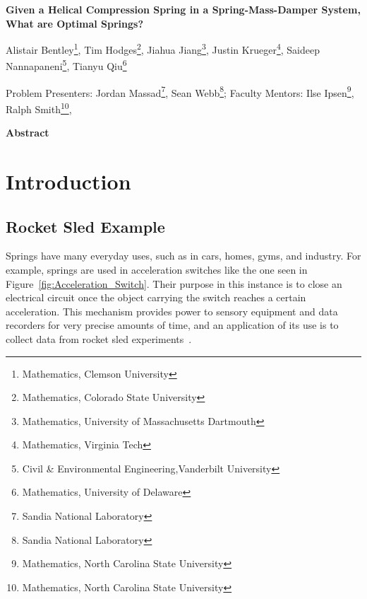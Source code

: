 \documentclass[10pt]{article}
\begin{document}
\centerline{\large \bf Given a Helical Compression Spring in a Spring-Mass-Damper System, What are Optimal Springs?}

\vspace{.1truein}

\def\thefootnote{\arabic{footnote}}
\begin{center}
  
  Alistair Bentley\footnote{Mathematics, Clemson University},
   Tim Hodges\footnote{Mathematics, Colorado State University},
   Jiahua Jiang\footnote{Mathematics, University of Massachusetts Dartmouth },
  Justin Krueger\footnote{Mathematics, Virginia Tech},
  Saideep Nannapaneni\footnote{Civil \& Environmental Engineering,Vanderbilt University},
  Tianyu Qiu\footnote{Mathematics, University of Delaware}
   
\end{center}



\begin{center}
Problem Presenters: Jordan Massad\footnote{Sandia National Laboratory},
Sean Webb\footnote{Sandia National Laboratory};
	Faculty Mentors: Ilse Ipsen\footnote{Mathematics, North Carolina State University},
	Ralph Smith\footnote{Mathematics, North Carolina State University}, 
\end{center}


\vspace{.3truein}
\centerline{\bf Abstract}


\section{Introduction}
\label{sec:Introduction}

\subsection{Rocket Sled Example}
\label{subsec:Example}

Springs have many everyday uses, such as in cars, homes, gyms, and industry. For example, springs are used in acceleration switches like the one seen in Figure~\ref{fig:Acceleration_Switch}. Their purpose in this instance is to close an electrical circuit once the object carrying the switch reaches a certain acceleration. This mechanism provides power to sensory equipment and data recorders for very precise amounts of time, and an application of its use is to collect data from rocket sled experiments~\cite{Massad2015}. 
\end{document}
